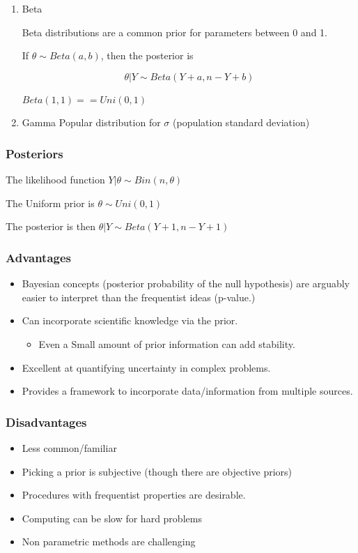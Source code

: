 \documentclass[11pt]{article}
\begin{document}
\begin{enumerate}
\item Beta
\label{sec:org2dcadd7}

Beta distributions are a common prior for parameters between 0 and 1.

If \(\theta \sim Beta(a, b)\), then the posterior is

$$
\theta | Y \sim Beta(Y + a, n - Y + b)
$$


\(Beta(1,1) == Uni(0,1)\)

\item Gamma
\label{sec:orga22dfa1}
Popular distribution for \(\sigma\) (population standard deviation)
\end{enumerate}

\subsubsection{Posteriors}
\label{sec:org168508e}

The likelihood function \(Y | \theta \sim Bin(n, \theta)\)

The Uniform prior is \(\theta \sim Uni(0, 1)\)

The posterior is then \(\theta | Y \sim Beta(Y + 1, n - Y + 1)\)

\subsubsection{Advantages}
\label{sec:org6ffe0b2}
\begin{itemize}
\item Bayesian concepts (posterior probability of the null hypothesis) are arguably
easier to interpret than the frequentist ideas (p-value.)
\item Can incorporate scientific knowledge via the prior.
\begin{itemize}
\item Even a Small amount of prior information can add stability.
\end{itemize}
\item Excellent at quantifying uncertainty in complex problems.
\item Provides a framework to incorporate data/information from multiple sources.
\end{itemize}

\subsubsection{Disadvantages}
\label{sec:org55093de}
\begin{itemize}
\item Less common/familiar
\item Picking a prior is subjective (though there are objective priors)
\item Procedures with frequentist properties are desirable.
\item Computing can be slow for hard problems
\item Non parametric methods are challenging
\end{itemize}
\end{document}
